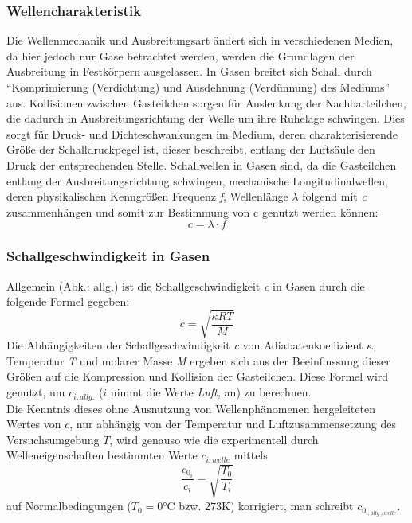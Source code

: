 \subsubsection{Wellencharakteristik}
Die Wellenmechanik und Ausbreitungsart ändert sich in verschiedenen Medien, da hier jedoch nur Gase betrachtet werden, werden die Grundlagen der Ausbreitung in Festkörpern ausgelassen. In Gasen breitet sich Schall durch \enquote{Komprimierung (Verdichtung) und Ausdehnung (Verdünnung) des Mediums} \autocite{Tipler} aus. Kollisionen zwischen Gasteilchen sorgen für Auslenkung der Nachbarteilchen, die dadurch in Ausbreitungsrichtung der Welle um ihre Ruhelage schwingen. Dies sorgt für Druck- und Dichteschwankungen im Medium, deren charakterisierende Größe der Schalldruckpegel ist, dieser beschreibt, entlang der Luftsäule den Druck der entsprechenden Stelle. Schallwellen in Gasen sind, da die Gasteilchen entlang der Ausbreitungsrichtung schwingen, mechanische Longitudinalwellen, deren physikalischen Kenngrößen Frequenz \emph{f}, Wellenlänge \(\lambda\) folgend mit \emph{c} zusammenhängen und somit zur Bestimmung von c genutzt werden können:
\begin{equation}
    c=\lambda \cdot f
    \label{eq:c}
\end{equation}

\subsubsection{Schallgeschwindigkeit in Gasen}
Allgemein (Abk.: allg.) ist die Schallgeschwindigkeit \emph{c} in Gasen durch die folgende Formel gegeben:
\begin{equation}
    c=\sqrt{\frac{\kappa RT}{M}}
    \label{eq:allg}
\end{equation}
Die Abhängigkeiten der Schallgeschwindigkeit \emph{c} von Adiabatenkoeffizient \emph{\(\kappa\)}, Temperatur \emph{T} und molarer Masse \emph{M} ergeben sich aus der Beeinflussung dieser Größen auf die Kompression und Kollision der Gasteilchen. Diese Formel wird genutzt, um \(c_{i, allg.}\) (\(i\) nimmt die Werte \emph{Luft, } an) zu berechnen.\\
Die Kenntnis dieses ohne Ausnutzung von Wellenphänomenen hergeleiteten Wertes von \(c\), nur abhängig von der Temperatur und Luftzusammensetzung des Versuchsumgebung \(T\), wird genauso wie die experimentell durch Welleneigenschaften bestimmten Werte \(c_{i, welle}\) mittels 
\begin{equation}
    \frac{c_{0_i}}{c_i} = \sqrt{\frac{T_0}{T_i}}
    \label{eq:normal}
\end{equation}
auf Normalbedingungen (\(T_0=0\)°C bzw. 273K) korrigiert, man schreibt \(c_{0_{i, allg./welle}}\).

